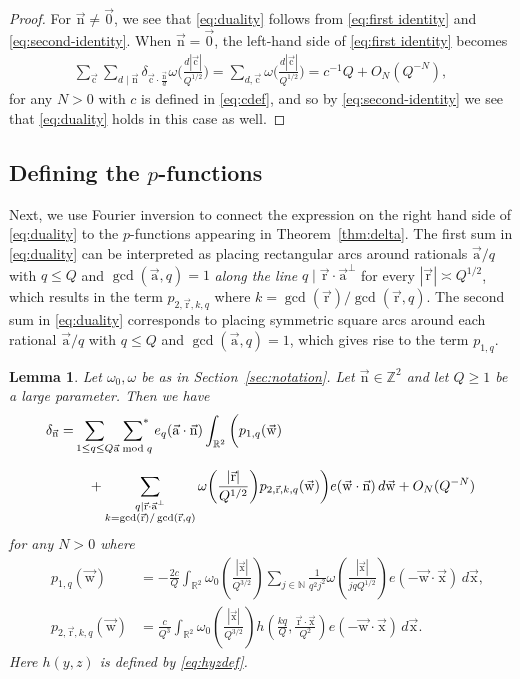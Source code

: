 \documentclass[letterpaper,11pt]{amsart}
\numberwithin{equation}{section}
\newtheorem{lemma}[theorem]{Lemma}
\theoremstyle{definition}
\numberwithin{equation}{section}
\newcommand{\NN}{\mathbb{N}}
\newcommand{\starsum}{\sideset{}{^*}\sum}
\newcommand{\ux}{{\vec{\mathrm{x}}}}
\newcommand{\ua}{\vec{\mathrm{a}}}
\newcommand{\ur}{\vec{\mathrm{r}}}
\newcommand{\uw}{{\vec{\mathrm{w}}}}
\newcommand{\uc}{{\vec{\mathrm{c}}}}
\newcommand{\R}{\mathbb{R}}
\newcommand{\nn}{\vec{\mathrm{n}}}
\begin{document}
\begin{proof}
    For $\nn\not=\vec{0}$, we see that \eqref{eq:duality} follows from \eqref{eq:first identity} and \eqref{eq:second-identity}. 
    When $\nn=\vec{0}$, the left-hand side of \eqref{eq:first identity} becomes 
	\begin{align*}
	\sum_{\uc}\sum_{d\mid \nn}\delta_{\uc \cdot \frac{\nn}{d}}\omega\Big(\frac{d|\uc|}{Q^{1/2}}\Big)=\sum_{d,\uc}\omega\Big(\frac{d|\uc|}{Q^{1/2}}\Big)=c^{-1}Q+O_N(Q^{-N}), 
	\end{align*}
	for any $N>0$ with $c$ is defined in \eqref{eq:cdef}, and so by \eqref{eq:second-identity} we see that \eqref{eq:duality} holds in this case as well. 
\end{proof}

\subsection{Defining the \(p\)-functions}
Next, we use Fourier inversion to connect the expression on the right hand side of \eqref{eq:duality} to the $p$-functions appearing in Theorem~\ref{thm:delta}. The first sum in \eqref{eq:duality} can be interpreted as placing rectangular arcs around rationals $\ua/q$ with $q\leq Q$ and $\gcd(\ua,q)=1$ \emph{along the line} $q\mid  \ur\cdot \ua^\perp$ for every $|\ur|\asymp Q^{1/2}$, which results in the term $p_{2,\ur,k,q}$ where $k=\gcd(\ur)/\gcd(\ur, q)$. The second sum in \eqref{eq:duality} corresponds to placing symmetric square arcs
around each rational $\ua/q$ with $q\leq Q$ and $\gcd(\ua,q)=1$, which gives rise to the term $p_{1,q}$. 
 
\begin{lemma}\label{lem:def_of_p_i}
	Let $\omega_0, \omega$ be as in Section~\ref{sec:notation}. Let $\nn\in \mathbb Z^2$ and let $Q\geq 1$ be a large parameter. 
	Then we have
		\begin{equation}\begin{split}\label{eq:p1p2}
		\delta_{\nn}
	=& 
	\sum_{1\leq q\leq Q}
	\underset{\hphantom{\ua\bmod{q}}}{\starsum_{\ua\bmod{q}}}
	e_q(\ua\cdot \nn)
	\int_{\R^2}
	\bigg(p_{1,q}(\uw)\\ & \quad +
	\sum_{\substack{q\mid \ur\cdot \ua^\perp\\ k=\gcd(\ur)/\gcd(\ur, q)}}
	\omega\bigg(
	\frac{ |\ur| }{ Q^{1/2}}
	\bigg)
	p_{2,\ur,k,q}(\uw)
	\bigg)
	e(\uw\cdot\nn)\,d\uw
 +O_N(Q^{-N})
 \end{split}
	\end{equation}
	for any $N>0$	where 
		\begin{align}
		\label{defp2}\quad
			p_{1,q}(\uw)
			&=
			-\frac{2c}{Q}
			\int_{\R^2} 
			\omega_0\left(\frac{|\ux|}{Q^{3/2}}\right)
			\sum_{j\in\NN}
			\frac{1}{q^2j^2}
			\omega
			\left(\frac{|\ux|}{jqQ^{1/2}}
			\right)
			e(-\uw\cdot \ux)
			\,d\ux,\\
				\label{defp1}\quad
				p_{2,\ur,k,q}(\uw)
				&=\frac{c}{Q^3}
				\int_{\R^2} 
				\omega_0\left(\frac{|\ux|}{Q^{3/2}}\right)
				h\left(
				\frac{kq}{Q},
				\frac{\ur\cdot \ux }{ Q^2}
				\right)
				e(-\uw\cdot \ux)
				\,d\ux.
	\end{align}
	Here $h(y,z)$ is defined by \eqref{eq:hyzdef}. 
\end{lemma}
\end{document}
